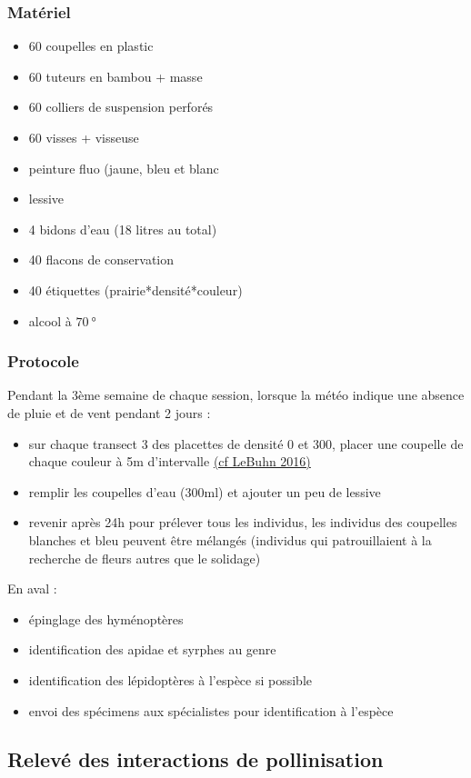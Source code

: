 \documentclass{article}
\begin{document}
	\subsubsection{Matériel}
	\begin{itemize}
		\item 60 coupelles en plastic
		\item 60 tuteurs en bambou + masse
		\item 60 colliers de suspension perforés
		\item 60 visses + visseuse
		\item peinture fluo (jaune, bleu et blanc
		\item lessive
		\item 4 bidons d'eau (18 litres au total)
		\item 40 flacons de conservation
		\item 40 étiquettes (prairie*densité*couleur)
		\item alcool à $\SI{70}{\degree}$
	\end{itemize}
	\subsubsection{Protocole}
	Pendant la 3ème semaine de chaque session, lorsque la météo indique une absence de pluie et de vent pendant 2 jours :
	\begin{itemize}
		\item sur chaque transect 3 des placettes de densité 0 et 300, placer une coupelle de chaque couleur à 5m d'intervalle \underline{(cf LeBuhn 2016)}
		\item remplir les coupelles d'eau (300ml) et ajouter un peu de lessive
		\item revenir après 24h pour prélever tous les individus, les individus des coupelles blanches et bleu peuvent être mélangés (individus qui patrouillaient à la recherche de fleurs autres que le solidage)
	\end{itemize}
		En aval :
	\begin{itemize}
		\item épinglage des hyménoptères
		\item identification des apidae et syrphes au genre
		\item identification des lépidoptères à l'espèce si possible
		\item envoi des spécimens aux spécialistes pour identification à l'espèce
	\end{itemize}
	\pagebreak
	
	\subsection{Relevé des interactions de pollinisation}
\end{document}
